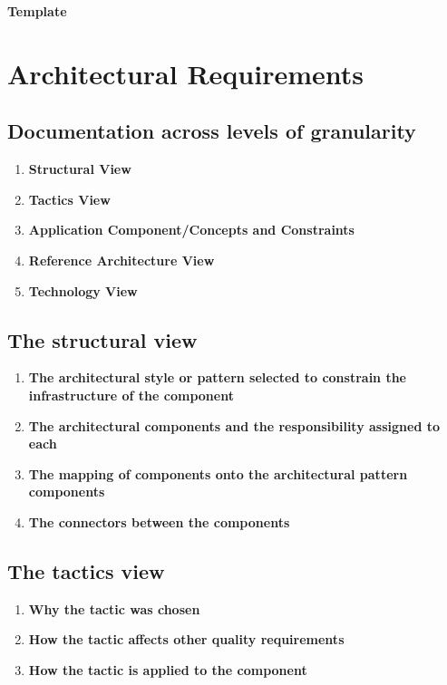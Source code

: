 \documentclass[11pt]{article}
\begin{document}


\tableofcontents	%
\newpage

\begin{center}
\textbf{Template}
\end{center}
\section{Architectural Requirements}
	\subsection{Documentation across levels of granularity}
	\begin{enumerate}
		\item \textbf {Structural View}
		\item \textbf {Tactics View}
		\item \textbf {Application Component/Concepts and Constraints}
		\item \textbf {Reference Architecture View}
		\item \textbf {Technology View}
	\end{enumerate}
	\subsection{The structural view}
	\begin{enumerate}
		\item \textbf {The architectural style or pattern selected to constrain the infrastructure of the component}
		\item \textbf {The architectural components and the responsibility assigned to each}
		\item \textbf {The mapping of components onto the architectural pattern components}
		\item \textbf {The connectors between the components}
	\end{enumerate}
	\subsection{The tactics view}
	\begin{enumerate}
		\item \textbf {Why the tactic was chosen}
		\item \textbf {How the tactic affects other quality requirements}
		\item \textbf {How the tactic is applied to the component}
	\end{enumerate}
\end{document}
